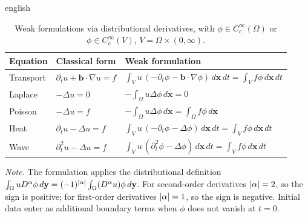 \begin{hyphenrules}{english}
\begin{table}[htbp]
  \centering
  \caption[Weak formulations via distributional derivatives]{Weak formulations via distributional derivatives, with
  $\phi\in C_c^\infty(\Omega)$ or $\phi\in C_c^\infty(V)$, $V=\Omega\times(0,\infty)$.}
  \label{tab:weak-forms}
  \small
  \begin{tabular}{@{}lll@{}}
    \toprule
    Equation & Classical form & Weak formulation \\
    \midrule
    Transport & $\partial_t u+\mathbf{b}\cdot\nabla u=f$ & $\displaystyle\int_V u\,(-\partial_t\phi-\mathbf{b}\cdot\nabla\phi)\,d\mathbf{x}\,d t=\int_V f\phi\,d\mathbf{x}\,d t$ \\[3mm]
    Laplace   & $-\Delta u=0$ & $\displaystyle-\int_\Omega u\Delta\phi\,d\mathbf{x}=0$ \\[3mm]
    Poisson   & $-\Delta u=f$ & $\displaystyle-\int_\Omega u\Delta\phi\,d\mathbf{x}=\int_\Omega f\phi\,d\mathbf{x}$ \\[3mm]
    Heat      & $\partial_t u-\Delta u=f$ & $\displaystyle\int_V u\,(-\partial_t\phi-\Delta\phi)\,d\mathbf{x}\,d t=\int_V f\phi\,d\mathbf{x}\,d t$ \\[3mm]
    Wave      & $\partial_t^2u-\Delta u=f$ & $\displaystyle\int_V u\,(\partial_t^2\phi-\Delta\phi)\,d\mathbf{x}\,d t=\int_V f\phi\,d\mathbf{x}\,d t$ \\
    \bottomrule
  \end{tabular}
  \par\smallskip
  \parbox{0.92\linewidth}{\footnotesize\emph{Note.} The formulation applies the distributional definition
  $\int_\Omega uD^\alpha\phi\,d\mathbf{y}=(-1)^{\left\lvert \alpha \right\rvert}\int_\Omega(D^\alpha u)\phi\,d\mathbf{y}$. For second-order
  derivatives $\left\lvert \alpha \right\rvert=2$, so the sign is positive; for first-order derivatives $\left\lvert \alpha \right\rvert=1$, so
  the sign is negative. Initial data enter as additional boundary terms when $\phi$ does not vanish at
  $t=0$.}
\end{table}


\end{hyphenrules}
